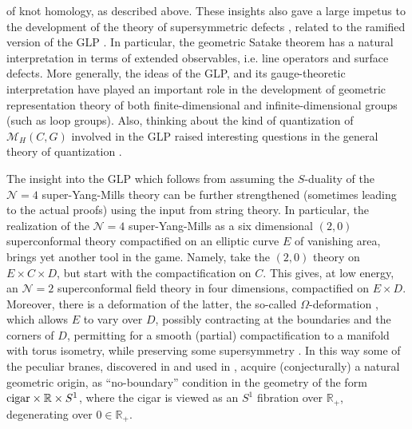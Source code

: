 \documentclass[12pt]{article}
\newcommand\BR{\mathbb{R}}
\newcommand\CalN{\mathcal{N}}
\newcommand\CalM{\mathcal{M}}
\begin{document}
of knot homology, as described above. 
%
These insights also gave a large impetus to the development of the theory of supersymmetric defects \cite{NN2004:BPSCFT1}, related to the
ramified version of the GLP \cite{Gukov:2006jk, Witten:2007td, Gukov:2008sn, Gukov:2014gja}. In particular, the geometric Satake theorem has a natural 
interpretation in terms of extended observables, i.e. line operators 
\cite{Ben-Zvi:2013zda,Ben-Zvi:2016mrh, Ben-Zvi:2017jfi,Frenkel:2007tx,HiRa} and surface defects. More generally, the ideas of the GLP, and its gauge-theoretic interpretation have played an important role in the development of geometric representation theory  
\cite{ChrissGinzburg-GRT} 
of both finite-dimensional and infinite-dimensional groups (such as loop groups). Also, thinking about the kind of quantization 
of ${\CalM}_{H}(C, G)$  involved in the GLP 
raised interesting questions in the general 
theory of quantization \cite{Gukov:2008ve, Nekrasov:2009rc, Etingof:2019pni,Nekrasov:2010ka, NRS, Frenkel:2018dic,Gaiotto:2021kma,Gaiotto:2021tsq,Teschner:2017djr}.

The insight into the GLP which follows from assuming the $S$-duality of the ${\CalN}=4$ super-Yang-Mills theory can be 
further strengthened (sometimes leading to the actual proofs) using the input from string theory.  In particular, the realization
of the ${\CalN}=4$ super-Yang-Mills as a six dimensional $(2,0)$ superconformal theory compactified on an elliptic curve $E$
of vanishing area, brings yet another tool in the game. Namely, take the $(2,0)$ theory
on $E \times C \times D$, but start with the compactification on $C$. This gives, at low energy, an ${\CalN}=2$
superconformal field theory in four dimensions, compactified on $E \times D$. Moreover, there is a deformation of the latter,
the so-called $\Omega$-deformation \cite{Nekrasov:2002qd}, 
which allows $E$ to vary over $D$, possibly contracting at the boundaries and the corners of $D$, permitting for a smooth (partial) compactification to a manifold with torus isometry, while preserving some supersymmetry \cite{Nekrasov:2010ka}. 
In this way some of the peculiar branes, discovered in \cite{Kapustin:2001ij} and used in \cite{Kapustin:2006pk}, acquire (conjecturally) a natural geometric origin, as ``no-boundary'' condition in the geometry of the form
${\rm cigar} \times {\BR} \times S^{1}$, where the cigar is viewed as an $S^1$ fibration over ${\BR}_{+}$, degenerating over $0 \in {\BR}_{+}$. 
\end{document}
